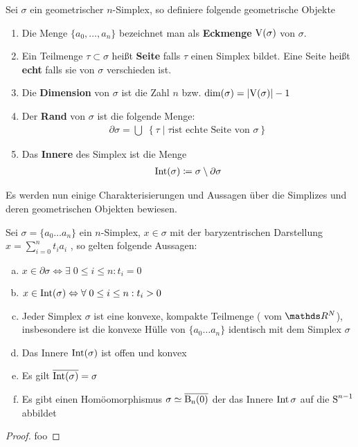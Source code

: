 \begin{Def}
  Sei $\sigma$ ein geometrischer $n$-Simplex, so definiere folgende
  geometrische Objekte
  \begin{enumerate}[\textbullet]%
  \item Die Menge $\{ a_0 , \ldots , a_n \}$ bezeichnet man als
    \textbf{Eckmenge} $\operatorname{V}(\sigma)$ von $\sigma$.
  \item Ein Teilmenge $\tau \subset \sigma$ heißt \textbf{Seite} falls
	  $\tau$ einen Simplex bildet. Eine Seite heißt \textbf{echt} falls sie von 
		$\sigma$ verschieden ist.
	\item Die \textbf{Dimension} von $\sigma$ ist die Zahl $n$ bzw. 
		$\dim(\sigma) = \left| \operatorname{V}(\sigma) \right| - 1$
  \item Der \textbf{Rand} von $\sigma$ ist die folgende Menge:
    \begin{gather*}
      \partial\sigma = \bigcup \; \left\{ \tau \; \Big| \; \tau \text{
          ist echte Seite von } \sigma \right\}
    \end{gather*}
  \item Das \textbf{Innere} des Simplex ist die Menge
    \begin{gather*}
    	\operatorname{Int}(\sigma) \coloneqq \sigma \setminus \partial\sigma
    \end{gather*}
  \end{enumerate}
\end{Def}


Es werden nun einige Charakterisierungen und Aussagen über die
Simplizes und deren geometrischen Objekten bewiesen.

\begin{Satz}
  \normalfont Sei $\sigma = \{ a_0 \ldots a_n \}$ ein $n$-Simplex,
  $x \in \sigma$ mit der baryzentrischen Darstellung
  $x=\sum\limits_{i=0}^n t_i a_i$ , so gelten folgende Aussagen:
  \begin{enumerate}[(a)]
  \item
    $x \in \partial\sigma \Leftrightarrow \exists \; 0 \leq i \leq n :
    t_i = 0$
  \item
    $x \in \operatorname{Int}(\sigma) \Leftrightarrow \forall \; 0 \leq i \leq n :
    t_i > 0$
  \item Jeder Simplex $\sigma$ ist eine konvexe, kompakte Teilmenge (
    vom $\R^N$), insbesondere ist die konvexe Hülle von
    $\{ a_0 \ldots a_n \}$ identisch mit dem Simplex $\sigma$
  \item Das Innere $\operatorname{Int}(\sigma)$ ist offen und konvex
  \item Es gilt $\overline{\operatorname{Int}(\sigma)} = \sigma$
  \item Es gibt einen Homöomorphismus $\sigma \simeq \operatorname{\overline{\operatorname{B}_n(0)}}$ der das
    Innere $\operatorname{Int}{\sigma}$ auf die $\operatorname{S}^{n-1}$ abbildet
  \end{enumerate}
  \begin{proof}
    foo
  \end{proof}
\end{Satz}


